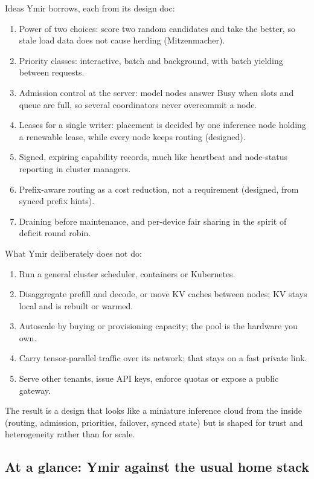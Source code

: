\noindent Ideas Ymir borrows, each from its design doc:
\begin{enumerate}
  \item Power of two choices: score two random candidates and take the better, so stale load data does not cause herding (Mitzenmacher).
  \item Priority classes: interactive, batch and background, with batch yielding between requests.
  \item Admission control at the server: model nodes answer Busy when slots and queue are full, so several coordinators never overcommit a node.
  \item Leases for a single writer: placement is decided by one inference node holding a renewable lease, while every node keeps routing (designed).
  \item Signed, expiring capability records, much like heartbeat and node-status reporting in cluster managers.
  \item Prefix-aware routing as a cost reduction, not a requirement (designed, from synced prefix hints).
  \item Draining before maintenance, and per-device fair sharing in the spirit of deficit round robin.
\end{enumerate}

\noindent What Ymir deliberately does not do:
\begin{enumerate}
  \item Run a general cluster scheduler, containers or Kubernetes.
  \item Disaggregate prefill and decode, or move KV caches between nodes; KV stays local and is rebuilt or warmed.
  \item Autoscale by buying or provisioning capacity; the pool is the hardware you own.
  \item Carry tensor-parallel traffic over its network; that stays on a fast private link.
  \item Serve other tenants, issue API keys, enforce quotas or expose a public gateway.
\end{enumerate}

The result is a design that looks like a miniature inference cloud from the inside (routing,
admission, priorities, failover, synced state) but is shaped for trust and heterogeneity rather
than for scale.

\subsection{At a glance: Ymir against the usual home stack}\label{sec:comparison-summary}

